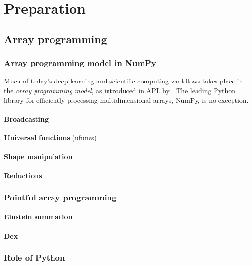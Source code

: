 \chapter{Preparation}

\section{Array programming}

\subsection{Array programming model in NumPy}

Much of today's deep learning and scientific computing workflows takes place in the \textit{array programming model}, as introduced in APL by \textcite{iverson1962programming}. The leading Python library for efficiently processing multidimensional arrays, NumPy, is no exception. 

\subsubsection{Broadcasting} \textbf{Universal functions} (ufuncs)

\subsubsection{Shape manipulation}

\subsubsection{Reductions}

\subsection{Pointful array programming}

\subsubsection{Einstein summation}

\subsubsection{Dex}

\subsection{Role of Python}


